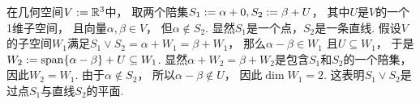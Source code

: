 \begin{example}
在几何空间\(V := \mathbb{R}^3\)中，
取两个陪集\(
	S_1 := \alpha + 0,
	S_2 := \beta + U
\)，
其中\(U\)是\(V\)的一个1维子空间，
且向量\(\alpha,\beta \in V\)，
但\(\alpha \notin S_2\).
显然\(S_1\)是一个点，\(S_2\)是一条直线.
假设\(V\)的子空间\(W_1\)满足\(
	S_1 \vee S_2
	= \alpha + W_1
	= \beta + W_1
\)，
那么\(\alpha - \beta \in W_1\)
且\(U \subseteq W_1\)，
于是\(
	W_2
	\allowbreak
	:= \operatorname{span}\{\alpha - \beta\} + U
	\allowbreak
	\subseteq W_1
\).
显然\(\alpha + W_2 = \beta + W_2\)是包含\(S_1\)和\(S_2\)的一个陪集，
因此\(W_2 = W_1\).
由于\(\alpha \notin S_2\)，
所以\(\alpha - \beta \notin U\)，
因此\(\dim W_1 = 2\).
这表明\(S_1 \vee S_2\)是过点\(S_1\)与直线\(S_2\)的平面.
\end{example}
